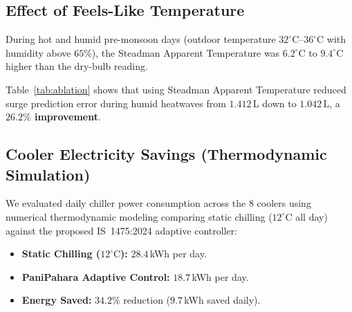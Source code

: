 \documentclass[conference]{IEEEtran}
\begin{document}
\subsection{Effect of Feels-Like Temperature}
During hot and humid pre-monsoon days (outdoor temperature $32^\circ\text{C}$--$36^\circ\text{C}$ with humidity above $65\%$), the Steadman Apparent Temperature was $6.2^\circ\text{C}$ to $9.4^\circ\text{C}$ higher than the dry-bulb reading.

Table~\ref{tab:ablation} shows that using Steadman Apparent Temperature reduced surge prediction error during humid heatwaves from $1.412$\,L down to $1.042$\,L, a \textbf{$26.2\%$ improvement}.

\begin{table}[!t]
\centering
\caption{Ablation Study: Weather Feature Impact}
\label{tab:ablation}
\end{table}

\subsection{Cooler Electricity Savings (Thermodynamic Simulation)}
We evaluated daily chiller power consumption across the 8 coolers using numerical thermodynamic modeling comparing static chilling ($12^\circ\text{C}$ all day) against the proposed IS~1475:2024 adaptive controller:
\begin{itemize}
    \item \textbf{Static Chilling ($12^\circ\text{C}$):} $28.4$\,kWh per day.
    \item \textbf{PaniPahara Adaptive Control:} $18.7$\,kWh per day.
    \item \textbf{Energy Saved:} \textbf{$34.2\%$} reduction ($9.7$\,kWh saved daily).
\end{itemize}
\end{document}
